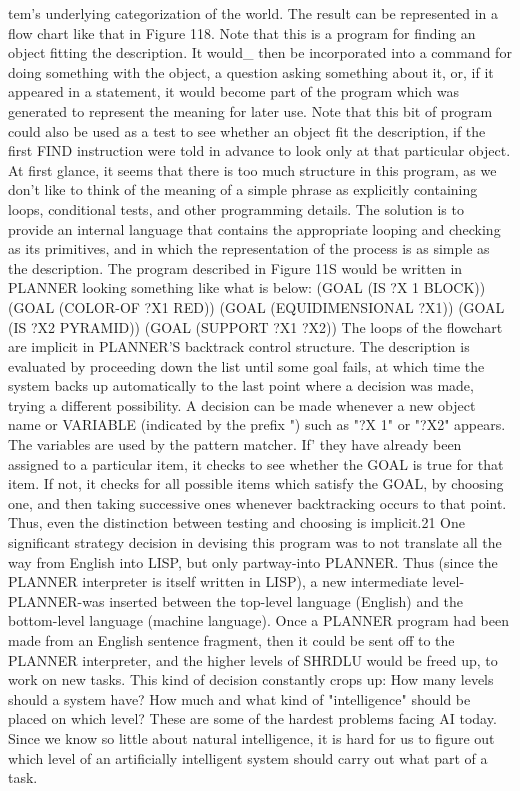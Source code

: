 {   tem's underlying categorization of the world. The result can be represented in a
   flow chart like that in Figure 118. Note that this is a program for finding an object
   fitting the description. It would\_ then be incorporated into a command for doing
   something with the object, a question asking something about it, or, if it appeared in
   a statement, it would become part of the program which was generated to represent
   the meaning for later use. Note that this bit of program could also be used as a test
   to see whether an object fit the description, if the first FIND instruction were told
   in advance to look only at that particular object.
            At first glance, it seems that there is too much structure in this program, as
   we don't like to think of the meaning of a simple phrase as explicitly containing
   loops, conditional tests, and other programming details. The solution is to provide
   an internal language that contains the appropriate looping and checking as its
   primitives, and in which the representation of the process is as simple as the
   description. The program described in Figure 11S would be written in PLANNER
   looking something like what is below:
                       (GOAL (IS ?X 1 BLOCK))
                       (GOAL (COLOR-OF ?X1 RED))
                       (GOAL (EQUIDIMENSIONAL ?X1))
                       (GOAL (IS ?X2 PYRAMID))
                       (GOAL (SUPPORT ?X1 ?X2))
   The loops of the flowchart are implicit in PLANNER'S backtrack control structure.
   The description is evaluated by proceeding down the list until some goal fails, at
   which time the system backs up automatically to the last point where a decision
   was made, trying a different possibility. A decision can be made whenever a new
   object name or VARIABLE (indicated by the prefix
   ") such as "?X 1" or "?X2" appears. The variables are used by the pattern matcher.
   If' they have already been assigned to a particular item, it checks to see whether the
   GOAL is true for that item. If not, it checks for all possible items which satisfy the
   GOAL, by choosing one, and then taking successive ones whenever backtracking
   occurs to that point. Thus, even the distinction between testing and choosing is
   implicit.21
One significant strategy decision in devising this program was to not translate all the way
from English into LISP, but only partway-into PLANNER. Thus (since the PLANNER
interpreter is itself written in LISP), a new intermediate level-PLANNER-was inserted
between the top-level language (English) and the bottom-level language (machine
language). Once a PLANNER program had been made from an English sentence
fragment, then it could be sent off to the PLANNER interpreter, and the higher levels of
SHRDLU would be freed up, to work on new tasks.
        This kind of decision constantly crops up: How many levels should a system
have? How much and what kind of "intelligence" should be placed on which level? These
are some of the hardest problems facing AI today. Since we know so little about natural
intelligence, it is hard for us to figure out which level of an artificially intelligent system
should carry out what part of a task.



}

